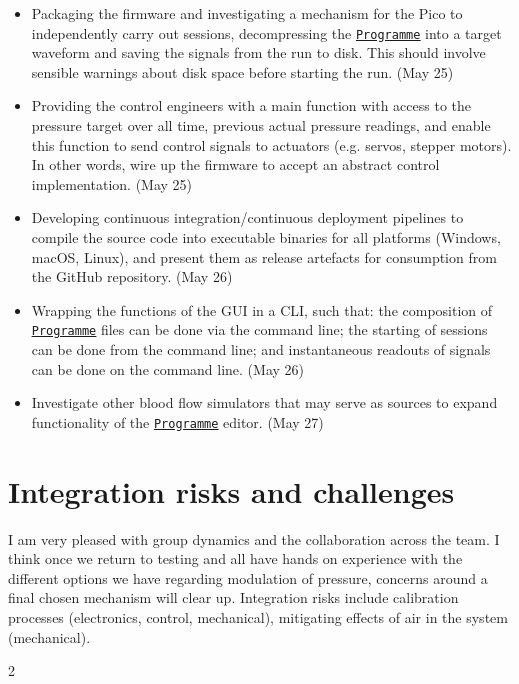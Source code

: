 \documentclass[10pt, a4paper]{article}
\newcommand{\pulsepumpdocbase}{https://pulsepump.github.io/pulsepump/api/core.html}
\newcommand{\Programme}{\underline{\href{\pulsepumpdocbase\#pulsepump.core.programme.Programme}{\texttt{Programme}}}}
\begin{document}
\begin{itemize}[noitemsep]
  \item Packaging the firmware and investigating a mechanism for the Pico to independently carry out sessions, decompressing the \Programme{} into a target waveform and saving the signals from the run to disk. This should involve sensible warnings about disk space before starting the run. (May 25)
  \item Providing the control engineers with a main function with access to the pressure target over all time, previous actual pressure readings, and enable this function to send control signals to actuators (e.g. servos, stepper motors). In other words, wire up the firmware to accept an abstract control implementation. (May 25)
  \item Developing continuous integration/continuous deployment pipelines to compile the source code into executable binaries for all platforms (Windows, macOS, Linux), and present them as release artefacts for consumption from the GitHub repository. (May 26)
  \item Wrapping the functions of the GUI in a CLI, such that: the composition of \Programme{} files can be done via the command line; the starting of sessions can be done from the command line; and instantaneous readouts of signals can be done on the command line. (May 26)
  \item Investigate other blood flow simulators that may serve as sources to expand functionality of the \Programme{} editor. (May 27)
\end{itemize}

\section{Integration risks and challenges}

I am very pleased with group dynamics and the collaboration across the team.
I think once we return to testing and all have hands on experience with the different options we have regarding modulation of pressure, concerns around a final chosen mechanism will clear up. Integration risks include calibration processes (electronics, control, mechanical), mitigating effects of air in the system (mechanical).

\begingroup
\renewcommand{\bibfont}{\footnotesize}
\printbibheading
\begin{multicols}{2}
  \printbibliography[heading=none]
\end{multicols}
\endgroup
\end{document}
